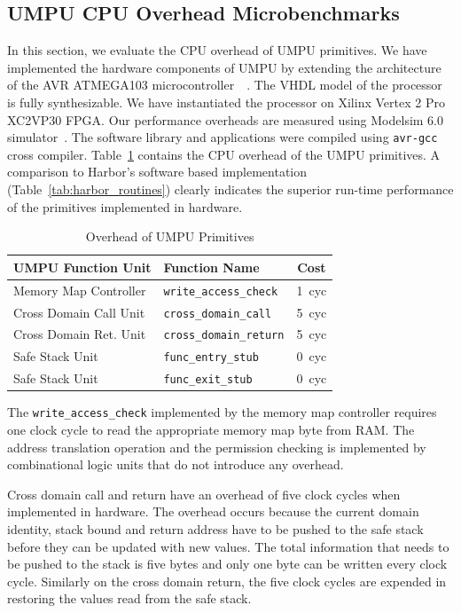 \subsection{UMPU CPU Overhead Microbenchmarks}
%
In this section, we evaluate the CPU overhead of UMPU primitives.
%
We have implemented the hardware components of UMPU by extending
the architecture of the AVR ATMEGA103
microcontroller~\cite{avr103manual}~\cite{avropencores}.
%
The VHDL model of the processor is fully synthesizable.
%
We have instantiated the processor on Xilinx Vertex 2 Pro XC2VP30 FPGA.
%
Our performance overheads are measured using Modelsim 6.0
simulator~\cite{modelsim}.
%
The software library and applications were compiled using
\texttt{avr-gcc} cross compiler.
%
Table~\ref{tab:umpumicrobmperf} contains the CPU overhead of the UMPU
primitives.
%
A comparison to Harbor's software based implementation
(Table~\ref{tab:harbor_routines}) clearly indicates the superior
run-time performance of the primitives implemented in hardware.
%
\begin{table}[htdp]
\centering
\small{
\begin{tabular}{|l|l|c|}
	\hline
	UMPU Function Unit & Function Name & Cost\\
	\hline
	Memory Map Controller &\texttt{write\_access\_check} & 1~cyc\\
	Cross Domain Call Unit &\texttt{cross\_domain\_call} & 5~cyc\\
	Cross Domain Ret. Unit &\texttt{cross\_domain\_return} & 5~cyc\\
	Safe Stack Unit &\texttt{func\_entry\_stub} & 0~cyc\\
	Safe Stack Unit &\texttt{func\_exit\_stub} & 0~cyc\\
	\hline
\end{tabular}}
\caption{Overhead of UMPU Primitives}
\label{tab:umpumicrobmperf}
\end{table}
%

The \texttt{write\_access\_check} implemented by the memory map
controller requires one clock cycle to read the appropriate memory map
byte from RAM.
%
The address translation operation and the permission checking is
implemented by combinational logic units that do not introduce any overhead.
%

Cross domain call and return have an overhead of five clock cycles
when implemented in hardware.
%
The overhead occurs because the current domain identity, stack bound
and return address have to be pushed to the safe stack before they can
be updated with new values.
%
The total information that needs to be pushed to the stack is five
bytes and only one byte can be written every clock cycle.
%
Similarly on the cross domain return, the five clock cycles are
expended in restoring the values read from the safe stack.

